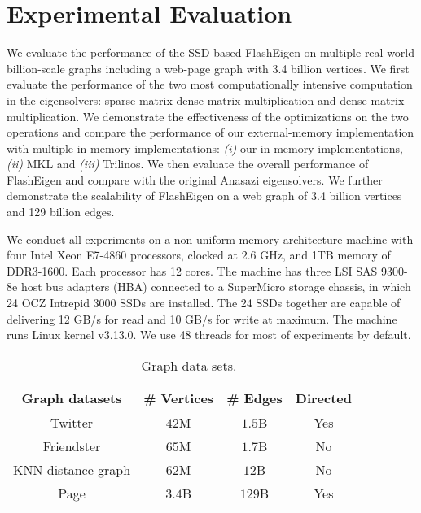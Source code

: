 \section{Experimental Evaluation}

We evaluate the performance of the SSD-based FlashEigen on multiple real-world
billion-scale graphs including a web-page graph with 3.4 billion vertices.
We first evaluate the performance
of the two most computationally intensive computation in the eigensolvers:
sparse matrix dense matrix multiplication and dense matrix multiplication.
We demonstrate the effectiveness of the optimizations on the two operations
and compare the performance of our external-memory implementation with
multiple in-memory implementations: \textit{(i)} our in-memory implementations,
\textit{(ii)} MKL and \textit{(iii)} Trilinos. We then evaluate the overall
performance of FlashEigen and compare with the original Anasazi eigensolvers.
We further demonstrate the scalability
of FlashEigen on a web graph of 3.4 billion vertices and 129 billion edges.

We conduct all experiments on a non-uniform memory architecture machine with
four Intel Xeon E7-4860 processors, clocked at 2.6 GHz, and 1TB memory of
DDR3-1600. Each processor has 12 cores. The machine has three LSI SAS 9300-8e
host bus adapters (HBA) connected to a SuperMicro storage chassis, in which
24 OCZ Intrepid 3000 SSDs are installed. The 24 SSDs together are capable of
delivering 12 GB/s for read and 10 GB/s for write at maximum. The machine runs
Linux kernel v3.13.0. We use 48 threads for most of experiments by default.

\begin{table}
\begin{center}
\footnotesize
\begin{tabular}{|c|c|c|c|c|}
\hline
Graph datasets & \# Vertices & \# Edges & Directed \\
\hline
Twitter \cite{twitter} & $42$M & $1.5$B & Yes \\
\hline
Friendster \cite{friendster} & $65$M & $1.7$B & No \\
\hline
KNN distance graph \cite{} & $62$M & $12$B & No \\
\hline
Page \cite{web_graph} & $3.4$B & $129$B & Yes \\
\hline
\end{tabular}
\normalsize
\end{center}
\caption{Graph data sets.}
\label{graphs}
\end{table}

